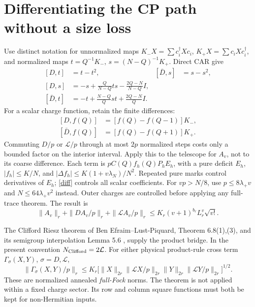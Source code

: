 \documentclass[11pt]{article}
\newcommand{\LL}{\mathcal L}
\begin{document}
\newpage
\section{Differentiating the CP path without a size loss}
Use distinct notation for unnormalized maps
$K_-X=\sum c_i^\dagger Xc_i$, $K_+X=\sum c_iXc_i^\dagger$,
and normalized maps $t=Q^{-1}K_-$, $s=(N-Q)^{-1}K_+$.
Direct CAR give
\begin{align}\label{comm}
 [D,t]&=t-t^2,&[\bar D,s]&=s-s^2,\\
 [D,s]&=-s+\frac Q{N-Q}ts-\frac{2Q-N}{N-Q}I,\\
 [\bar D,t]&=-t+\frac{N-Q}{Q}st+\frac{2Q-N}{Q}I.
\end{align}
For a scalar charge function, retain the finite differences:
\begin{align}\label{diff}
 [D,f(Q)]&=[f(Q)-f(Q-1)]K_-,\\
 [\bar D,f(Q)]&=[f(Q)-f(Q+1)]K_+.
\end{align}
Commuting $D/p$ or $\LL/p$ through at most $2p$ normalized
steps costs only a bounded factor on the interior interval.
Apply this to the telescope for $A_v$, not to its coarse difference.
Each term is $pC(Q)f_h(Q)P_hE_h$, with a pure deficit $E_h$,
$|f_h|\le K/N$, and
$|\Delta f_h|\le K(1+v\lambda_N)/N^2$.
Repeated pure marks control derivatives of $E_h$; \eqref{diff}
controls all scalar coefficients. For $vp>N/8$, use
$p\le8\lambda_+v$ and $N\le64\lambda_+v^2$ instead.
Outer charges are controlled before applying any full-trace theorem.
The result is
\begin{equation}\label{Ader}
 \|A_v\|_r+\|DA_v/p\|_r+\|\LL A_v/p\|_r
 \le K_r(v+1)^{b_r}L_r^v\sqrt{v!}.
\end{equation}

The Clifford Riesz theorem of Ben Efraim--Lust-Piquard,
Theorem 6.8(1),(3), and its semigroup interpolation Lemma 5.6
\cite{Riesz}, supply the product bridge. In the present convention
$N_{\rm Clifford}=2\LL$. For either physical product-rule cross
term $\Gamma_\sigma(X,Y)$, $\sigma=D,\LL$,
\begin{equation}\label{riesz}
 \|\Gamma_\sigma(X,Y)/p\|_r
 \le K_r\bigl[\|X\|_{2r}\|\LL X/p\|_{2r}
                   \|Y\|_{2r}\|\LL Y/p\|_{2r}\bigr]^{1/2}.
\end{equation}
These are normalized annealed \emph{full-Fock} norms. The theorem
is not applied within a fixed charge sector. Its row and column
square functions must both be kept for non-Hermitian inputs.

\newpage
\end{document}
